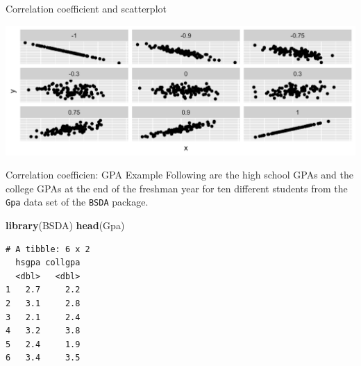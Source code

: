 \documentclass[
  ignorenonframetext,
]{beamer}
\newenvironment{Shaded}{\begin{snugshade}}{\end{snugshade}}
\newcommand{\FunctionTok}[1]{\textcolor[rgb]{0.13,0.29,0.53}{\textbf{#1}}}
\newcommand{\NormalTok}[1]{#1}
\begin{document}
\begin{frame}{Correlation coefficient and scatterplot}
\protect\hypertarget{correlation-coefficient-and-scatterplot}{}
\begin{center}\includegraphics[width=0.9\linewidth,height=0.45\textheight]{week4_2} \end{center}
\end{frame}

\begin{frame}[fragile]{Correlation coefficien: GPA Example}
\protect\hypertarget{correlation-coefficien-gpa-example}{}
Following are the high school GPAs and the college GPAs at the end of
the freshman year for ten different students from the \texttt{Gpa} data
set of the \texttt{BSDA} package.

\normalsize

\begin{Shaded}
\begin{Highlighting}[]
\FunctionTok{library}\NormalTok{(BSDA) }
\FunctionTok{head}\NormalTok{(Gpa)}
\end{Highlighting}
\end{Shaded}

\begin{verbatim}
# A tibble: 6 x 2
  hsgpa collgpa
  <dbl>   <dbl>
1   2.7     2.2
2   3.1     2.8
3   2.1     2.4
4   3.2     3.8
5   2.4     1.9
6   3.4     3.5
\end{verbatim}

\normalsize
\end{frame}
\end{document}
